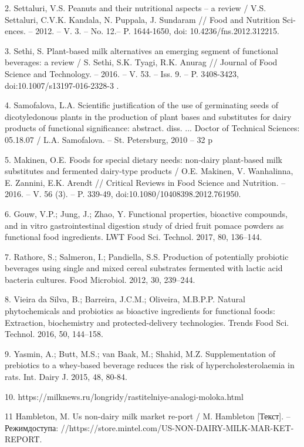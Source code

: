 2. Settaluri, V.S. Peanuts and their nutritional aspects -- a review /
V.S. Settaluri, C.V.K. Kandala, N. Puppala, J. Sundaram // Food and
Nutrition Sci-ences. -- 2012. -- V. 3. -- No. 12.-- P. 1644-1650, doi:
10.4236/fns.2012.312215.

3. Sethi, S. Plant-based milk alternatives an emerging segment of
functional beverages: a review / S. Sethi, S.K. Tyagi, R.K. Anurag //
Journal of Food Science and Technology. -- 2016. -- V. 53. -- Iss. 9. --
P. 3408-3423, doi:10.1007/s13197-016-2328-3 .

4. Samofalova, L.A. Scientific justification of the use of germinating
seeds of dicotyledonous plants in the production of plant bases and
substitutes for dairy products of functional significance: abstract.
diss. ... Doctor of Technical Sciences: 05.18.07 / L.A. Samofalova. --
St. Petersburg, 2010 -- 32 p

5. Makinen, O.E. Foods for special dietary needs: non-dairy plant-based
milk substitutes and fermented dairy-type products / O.E. Makinen, V.
Wanhalinna, E. Zannini, E.K. Arendt // Critical Reviews in Food Science
and Nutrition. -- 2016. -- V. 56 (3). -- P. 339-49,
doi:10.1080/10408398.2012.761950.

6. Gouw, V.P.; Jung, J.; Zhao, Y. Functional properties, bioactive
compounds, and in vitro gastrointestinal digestion study of dried fruit
pomace powders as functional food ingredients. LWT Food Sci. Technol.
2017, 80, 136--144.

7. Rathore, S.; Salmeron, I.; Pandiella, S.S. Production of potentially
probiotic beverages using single and mixed cereal substrates fermented
with lactic acid bacteria cultures. Food Microbiol. 2012, 30, 239--244.

8. Vieira da Silva, B.; Barreira, J.C.M.; Oliveira, M.B.P.P. Natural
phytochemicals and probiotics as bioactive ingredients for functional
foods: Extraction, biochemistry and protected-delivery technologies.
Trends Food Sci. Technol. 2016, 50, 144--158.

9. Yasmin, A.; Butt, M.S.; van Baak, M.; Shahid, M.Z. Supplementation of
prebiotics to a whey-based beverage reduces the risk of
hypercholesterolaemia in rats. Int. Dairy J. 2015, 48, 80-84.

10. https://milknews.ru/longridy/rastitelniye-analogi-moloka.html

11 Hambleton, M. Us non-dairy milk market re-port / M. Hambleton
{[}Текст{]}. -- Режимдоступа:
//https://store.mintel.com/US-NON-DAIRY-MILK-MAR-KET-REPORT.

